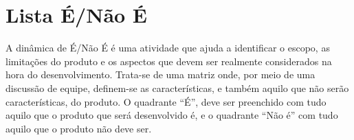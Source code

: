 \section{Lista É/Não É}
\par A dinâmica de É/Não É é uma atividade que ajuda a identificar o escopo, as limitações do produto e os aspectos que devem ser realmente considerados na hora do desenvolvimento. Trata-se de uma matriz onde, por meio de uma discussão de equipe, definem-se as características, e também aquilo que não serão características, do produto. O quadrante “É”, deve ser preenchido com tudo aquilo que o produto que será desenvolvido é, e o quadrante “Não é” com tudo aquilo que o produto não deve ser.

\begin{center}
\begin{table}[H]


\end{table}
\end{center}
